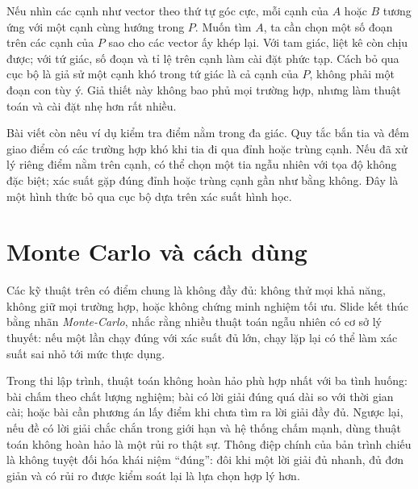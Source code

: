 \documentclass[11pt]{article}
\begin{document}
Nếu nhìn các cạnh như vector theo thứ tự góc cực, mỗi cạnh của \(A\) hoặc
\(B\) tương ứng với một cạnh cùng hướng trong \(P\). Muốn tìm \(A\), ta cần
chọn một số đoạn trên các cạnh của \(P\) sao cho các vector ấy khép lại. Với
tam giác, liệt kê còn chịu được; với tứ giác, số đoạn và tỉ lệ trên cạnh làm
cài đặt phức tạp. Cách bỏ qua cục bộ là giả sử một cạnh khó trong tứ giác là
cả cạnh của \(P\), không phải một đoạn con tùy ý. Giả thiết này không bao phủ
mọi trường hợp, nhưng làm thuật toán và cài đặt nhẹ hơn rất nhiều.

Bài viết còn nêu ví dụ kiểm tra điểm nằm trong đa giác. Quy tắc bắn tia và
đếm giao điểm có các trường hợp khó khi tia đi qua đỉnh hoặc trùng cạnh. Nếu
đã xử lý riêng điểm nằm trên cạnh, có thể chọn một tia ngẫu nhiên với tọa độ
không đặc biệt; xác suất gặp đúng đỉnh hoặc trùng cạnh gần như bằng không.
Đây là một hình thức bỏ qua cục bộ dựa trên xác suất hình học.

\section{Monte Carlo và cách dùng}

Các kỹ thuật trên có điểm chung là không đầy đủ: không thử mọi khả năng, không
giữ mọi trường hợp, hoặc không chứng minh nghiệm tối ưu. Slide kết thúc bằng
nhãn \textit{Monte-Carlo}, nhắc rằng nhiều thuật toán ngẫu nhiên có cơ sở lý
thuyết: nếu một lần chạy đúng với xác suất đủ lớn, chạy lặp lại có thể làm
xác suất sai nhỏ tới mức thực dụng.

Trong thi lập trình, thuật toán không hoàn hảo phù hợp nhất với ba tình huống:
bài chấm theo chất lượng nghiệm; bài có lời giải đúng quá dài so với thời gian
cài; hoặc bài cần phương án lấy điểm khi chưa tìm ra lời giải đầy đủ. Ngược
lại, nếu đề có lời giải chắc chắn trong giới hạn và hệ thống chấm mạnh, dùng
thuật toán không hoàn hảo là một rủi ro thật sự. Thông điệp chính của bản
trình chiếu là không tuyệt đối hóa khái niệm ``đúng'': đôi khi một lời giải
đủ nhanh, đủ đơn giản và có rủi ro được kiểm soát lại là lựa chọn hợp lý hơn.
\end{document}
